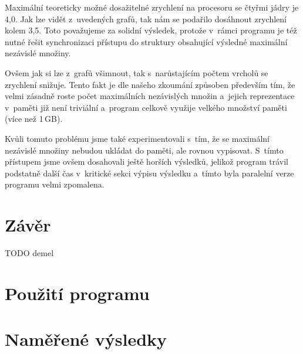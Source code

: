 \documentclass[12pt]{article}
\begin{document}
Maximální teoreticky možné dosažitelné zrychlení na procesoru se čtyřmi jádry je 4,0. Jak lze vidět z~uvedených grafů, tak nám se podařilo dosáhnout zrychlení kolem 3,5. Toto považujeme za solidní výsledek, protože v~rámci programu je též nutné řešit synchronizaci přístupu do struktury obsahující výsledné maximální nezávislé množiny. 

Ovšem jak si lze z~grafů všimnout, tak s~narůstajícím počtem vrcholů se zrychlení snižuje. Tento fakt je dle našeho zkoumání způsoben především tím, že velmi zásadně roste počet maximálních nezávislých množin a~jejich reprezentace v~paměti již není triviální a~program celkově využije velkého množství paměti (více než 1\,GB). 

Kvůli tomuto problému jsme také experimentovali s~tím, že se maximální nezávislé množiny nebudou ukládat do paměti, ale rovnou vypisovat. S~tímto přístupem jsme ovšem dosahovali ještě horších výsledků, jelikož program trávil podstatně další čas v~kritické sekci výpisu výsledku a~tímto byla paralelní verze programu velmi zpomalena. 

\section{Závěr}

\begin{thebibliography}{99}
 TODO demel
\end{thebibliography}

\appendix
\section{Použití programu} \label{appendix:ProgramUsage}

\section{Naměřené výsledky} \label{appendix:RawResults}
\end{document}
